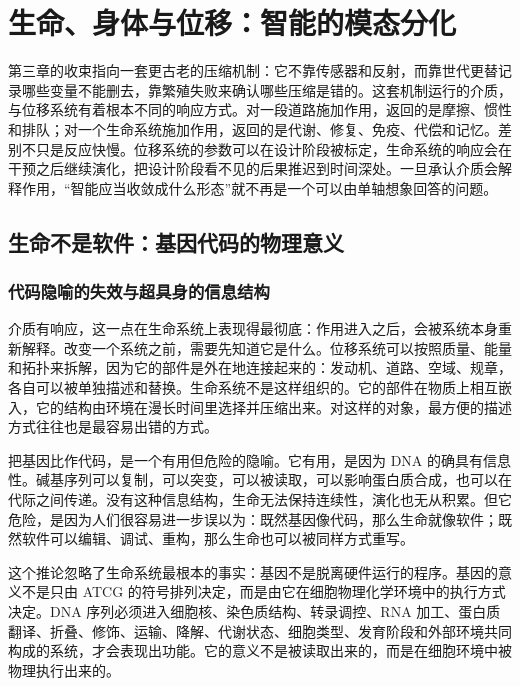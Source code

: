 \chapter{生命、身体与位移：智能的模态分化}

第三章的收束指向一套更古老的压缩机制：它不靠传感器和反射，而靠世代更替记录哪些变量不能删去，靠繁殖失败来确认哪些压缩是错的。这套机制运行的介质，与位移系统有着根本不同的响应方式。对一段道路施加作用，返回的是摩擦、惯性和排队；对一个生命系统施加作用，返回的是代谢、修复、免疫、代偿和记忆。差别不只是反应快慢。位移系统的参数可以在设计阶段被标定，生命系统的响应会在干预之后继续演化，把设计阶段看不见的后果推迟到时间深处。一旦承认介质会解释作用，“智能应当收敛成什么形态”就不再是一个可以由单轴想象回答的问题。

\section{生命不是软件：基因代码的物理意义}

\subsection{代码隐喻的失效与超具身的信息结构}

介质有响应，这一点在生命系统上表现得最彻底：作用进入之后，会被系统本身重新解释。改变一个系统之前，需要先知道它是什么。位移系统可以按照质量、能量和拓扑来拆解，因为它的部件是外在地连接起来的：发动机、道路、空域、规章，各自可以被单独描述和替换。生命系统不是这样组织的。它的部件在物质上相互嵌入，它的结构由环境在漫长时间里选择并压缩出来。对这样的对象，最方便的描述方式往往也是最容易出错的方式。


把基因比作代码，是一个有用但危险的隐喻。它有用，是因为 DNA 的确具有信息性。碱基序列可以复制，可以突变，可以被读取，可以影响蛋白质合成，也可以在代际之间传递。没有这种信息结构，生命无法保持连续性，演化也无从积累。但它危险，是因为人们很容易进一步误以为：既然基因像代码，那么生命就像软件；既然软件可以编辑、调试、重构，那么生命也可以被同样方式重写。

这个推论忽略了生命系统最根本的事实：基因不是脱离硬件运行的程序。基因的意义不是只由 ATCG 的符号排列决定，而是由它在细胞物理化学环境中的执行方式决定。DNA 序列必须进入细胞核、染色质结构、转录调控、RNA 加工、蛋白质翻译、折叠、修饰、运输、降解、代谢状态、细胞类型、发育阶段和外部环境共同构成的系统，才会表现出功能。它的意义不是被读取出来的，而是在细胞环境中被物理执行出来的。

